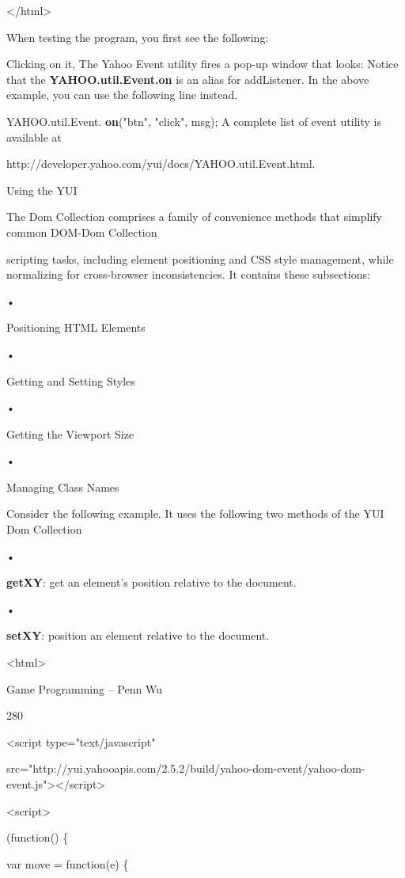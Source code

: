 \documentclass[
]{article}
\begin{document}
\textless/html\textgreater{}

When testing the program, you first see the following:

Clicking on it, The Yahoo Event utility fires a pop-up window that
looks: Notice that the \textbf{YAHOO.util.Event.on} is an alias for
addListener. In the above example, you can use the following line
instead.

YAHOO.util.Event. \textbf{on}("btn", "click", msg); A complete list of
event utility is available at

http://developer.yahoo.com/yui/docs/YAHOO.util.Event.html.

Using the YUI

The Dom Collection comprises a family of convenience methods that
simplify common DOM-Dom Collection

scripting tasks, including element positioning and CSS style management,
while normalizing for cross-browser inconsistencies. It contains these
subsections:

•

Positioning HTML Elements

•

Getting and Setting Styles

•

Getting the Viewport Size

•

Managing Class Names

Consider the following example. It uses the following two methods of the
YUI Dom Collection

•

\textbf{getXY}: get an element's position relative to the document.

•

\textbf{setXY}: position an element relative to the document.

\textless html\textgreater{}

Game Programming -- Penn Wu

280

\protect\hypertarget{index_split_015.htmlux5cux23p281}{}{}\textless script
type="text/javascript"

src="http://yui.yahooapis.com/2.5.2/build/yahoo-dom-event/yahoo-dom-event.js"\textgreater\textless/script\textgreater{}

\textless script\textgreater{}

(function() \{

var move = function(e) \{
\end{document}
